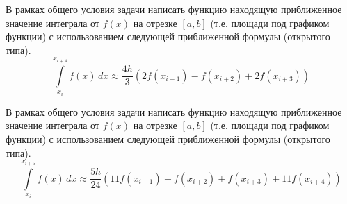 
\begin{zztask}
В рамках общего условия задачи написать функцию находящую приближенное значение 
интеграла от $f(x)$ на отрезке $[a, b]$ (т.е. площади под графиком функции)
с использованием следующей приближенной формулы (открытого типа). 
\[
\int\limits_{x_i}^{x_{i+4}} f(x)\,dx \approx \frac{4h}{3} \left( 2f(x_{i+1}) - f(x_{i+2}) + 2f(x_{i+3}) \right)
\]
\end{zztask}


\begin{zztask}
В рамках общего условия задачи написать функцию находящую приближенное значение 
интеграла от $f(x)$ на отрезке $[a, b]$ (т.е. площади под графиком функции)
с использованием следующей приближенной формулы (открытого типа). 
\[
\int\limits_{x_i}^{x_{i+5}} f(x)\,dx \approx 
\frac{5h}{24} \left( 11 f(x_{i+1}) + f(x_{i+2}) + f(x_{i+3}) + 11f(x_{i+4}) \right)
\]
\end{zztask}

